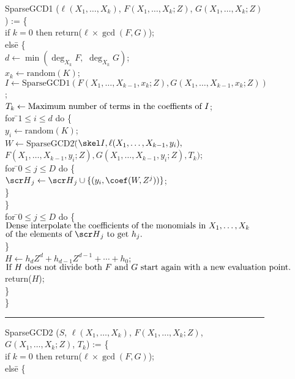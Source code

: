 \begin{figure}
\begindsacode
SparseGCD1 ($\ell(X_1, \ldots, X_k)$, $F(X_1, \ldots, X_k; Z)$, $G(X_1, \ldots, X_k; Z)$) := \{\\
\>if $k= 0$ then return($\ell \times \gcd(F, G)$); \\
\>els\=e \{ \\
\>\> $d \leftarrow \min(\deg_{X_k} F, \,\,\deg_{X_k} G)$; \\
\>\> $x_k \leftarrow \mbox{random}(K)$; \\
\>\> $I \leftarrow \mbox{SparseGCD1}(F(X_1, \ldots, X_{k-1}, x_k; Z),
G(X_1, \ldots, X_{k-1}, x_k; Z))$; \\
\>\> $T_k \leftarrow \mbox{\rm Maximum number of terms in the coeffients of $I$}$; \\
\>\> for \=$1 \le i \le d$ do \{ \\
\>\>\> $y_i \leftarrow \mbox{random}(K)$; \\
\>\>\> $W \leftarrow \mbox{SparseGCD2}($\=$\skel I, \ell(X_1, \ldots, X_{k-1}, y_i),$ \\
\>\>\>\> $F(X_1, \ldots, X_{k-1}, y_i; Z), G(X_1, \ldots, X_{k-1}, y_i; Z), T_k)$;\\
\>\>\> for \=$0 \le j \le D$ do \{ \\
\>\>\>\> ${\scr H}_j \leftarrow {\scr H}_j \cup \{(y_i, \coef(W, Z^j))\}$; \\
\>\>\>\> \} \\
\>\>\> \} \\
\>\> for \=$0 \le j \le D$ do \{ \\
\>\>\> $\mbox{\rm Dense interpolate the coefficients of the monomials in
$X_1, \ldots, X_k$}$\\
\>\>\> $\mbox{\rm of the elements of ${\scr H}_j$ to get $h_j$.}$\\
\>\>\> \} \\
\>\> $H \leftarrow h_d Z^d + h_{d-1} Z^{d-1} + \cdots + h_0$; \\
\>\> $\mbox{\rm If $H$ does not divide both $F$ and $G$ start again
with a new evaluation point.}$\\
\>\> return($H$); \\
\>\> \} \\
\> \}
\enddsacode
\hrule
\begindsacode
SparseGCD2 ($S$, $\ell(X_1, \ldots, X_k)$, $F(X_1, \ldots, X_{k}; Z)$, $G(X_1, \ldots, X_{k}; Z)$, $T_k$) := \{\\
\>if $k=0$ then return($\ell \times \gcd(F, G)$); \\
\>els\=e \{ \\

\end{figure}
